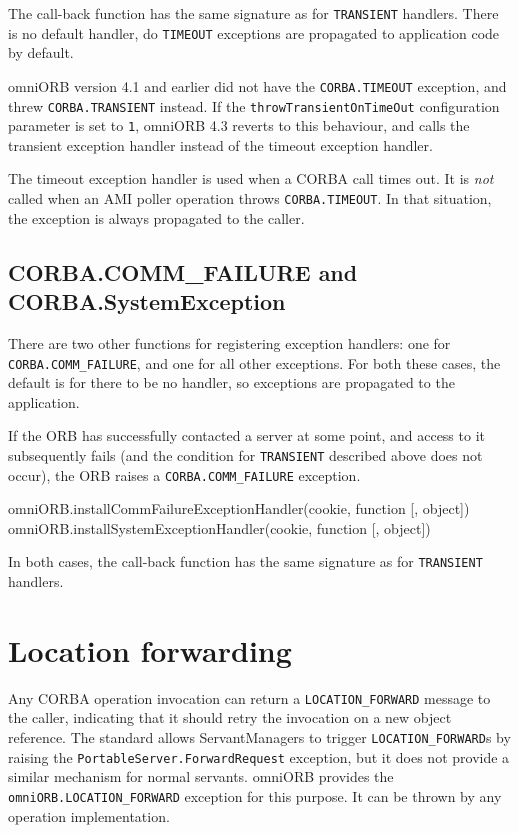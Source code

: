 \documentclass[11pt,oneside,a4paper]{book}
\newcommand{\code}[1]{\texttt{#1}}
\newcommand{\dsc}{\discretionary{}{}{}}
\begin{document}
The call-back function has the same signature as for \code{TRANSIENT}
handlers. There is no default handler, do \code{TIMEOUT} exceptions
are propagated to application code by default.

omniORB version 4.1 and earlier did not have the \code{CORBA.TIMEOUT}
exception, and threw \code{CORBA.TRANSIENT} instead. If the
\code{throwTransientOnTimeOut} configuration parameter is set to
\code{1}, omniORB 4.3 reverts to this behaviour, and calls the
transient exception handler instead of the timeout exception handler.

The timeout exception handler is used when a CORBA call times out. It
is \emph{not} called when an AMI poller operation throws
\code{CORBA.TIMEOUT}. In that situation, the exception is always
propagated to the caller.


\subsection{CORBA.COMM\_FAILURE and CORBA.SystemException}

There are two other functions for registering exception handlers: one
for \code{CORBA.\dsc{}COMM\_FAILURE}, and one for all other
exceptions. For both these cases, the default is for there to be no
handler, so exceptions are propagated to the application.

If the ORB has successfully contacted a server at some point, and
access to it subsequently fails (and the condition for
\code{TRANSIENT} described above does not occur), the ORB raises a
\code{CORBA.COMM\_\dsc{}FAILURE} exception.

\begin{pylisting}
omniORB.installCommFailureExceptionHandler(cookie, function [, object])
omniORB.installSystemExceptionHandler(cookie, function [, object])
\end{pylisting}

\noindent In both cases, the call-back function has the same signature
as for \code{TRANSIENT} handlers.



\section{Location forwarding}
\label{sec:locationForward}

Any CORBA operation invocation can return a \code{LOCATION\_FORWARD}
message to the caller, indicating that it should retry the invocation
on a new object reference. The standard allows ServantManagers to
trigger \code{LOCATION\_FORWARD}s by raising the
\code{PortableServer.ForwardRequest} exception, but it does not
provide a similar mechanism for normal servants. omniORB provides the
\code{omniORB.\dsc{}LOCATION\_FORWARD} exception for this purpose. It
can be thrown by any operation implementation.
\end{document}
